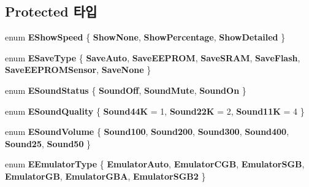 \subsection*{Protected 타입}
\begin{DoxyCompactItemize}
\item 
\mbox{\label{class_v_b_a_1_1_window_a9dfcf6d1a23c7576d357221d4bedda45}} 
enum {\bfseries E\+Show\+Speed} \{ {\bfseries Show\+None}, 
{\bfseries Show\+Percentage}, 
{\bfseries Show\+Detailed}
 \}
\item 
\mbox{\label{class_v_b_a_1_1_window_a299f71905bca4f89a8df627dd25dafa5}} 
enum {\bfseries E\+Save\+Type} \{ \newline
{\bfseries Save\+Auto}, 
{\bfseries Save\+E\+E\+P\+R\+OM}, 
{\bfseries Save\+S\+R\+AM}, 
{\bfseries Save\+Flash}, 
\newline
{\bfseries Save\+E\+E\+P\+R\+O\+M\+Sensor}, 
{\bfseries Save\+None}
 \}
\item 
\mbox{\label{class_v_b_a_1_1_window_a0d5c8ea46df2e5d53537db8aa5ecc175}} 
enum {\bfseries E\+Sound\+Status} \{ {\bfseries Sound\+Off}, 
{\bfseries Sound\+Mute}, 
{\bfseries Sound\+On}
 \}
\item 
\mbox{\label{class_v_b_a_1_1_window_a320f2aa064d602888b12cdd2ebfbb3c8}} 
enum {\bfseries E\+Sound\+Quality} \{ {\bfseries Sound44K} = 1, 
{\bfseries Sound22K} = 2, 
{\bfseries Sound11K} = 4
 \}
\item 
\mbox{\label{class_v_b_a_1_1_window_a50ce3c1e3f6a9ce3ed41b5c2a5535115}} 
enum {\bfseries E\+Sound\+Volume} \{ \newline
{\bfseries Sound100}, 
{\bfseries Sound200}, 
{\bfseries Sound300}, 
{\bfseries Sound400}, 
\newline
{\bfseries Sound25}, 
{\bfseries Sound50}
 \}
\item 
\mbox{\label{class_v_b_a_1_1_window_ac8b20507b5006b2ce37db6a76ea69b55}} 
enum {\bfseries E\+Emulator\+Type} \{ \newline
{\bfseries Emulator\+Auto}, 
{\bfseries Emulator\+C\+GB}, 
{\bfseries Emulator\+S\+GB}, 
{\bfseries Emulator\+GB}, 
\newline
{\bfseries Emulator\+G\+BA}, 
{\bfseries Emulator\+S\+G\+B2}
 \}
\end{DoxyCompactItemize}
